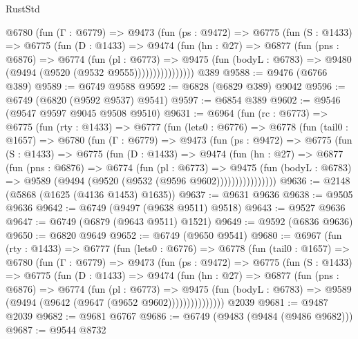 \begin{lexlean}{RustStd}
\begin{coremodule}
            @6780
              (fun (Γ : @6779) =>
              @9473
                (fun (ps : @9472) =>
                @6775
                  (fun (S : @1433) =>
                  @6775
                    (fun (D : @1433) =>
                    @9474
                      (fun (hn : @27) =>
                      @6877
                        (fun (pns : @6876) =>
                        @6774
                          (fun (pl : @6773) =>
                          @9475
                            (fun (bodyL : @6783) => @9480 (@9494 (@9520 (@9532 @9555))))))))))))))))
    @389
@9588 := @9476 (@6766 @389)
@9589 := @6749 @9588
@9592 := @6828 (@6829 @389) @9042
@9596 := @6749 (@6820 (@9592 @9537) @9541)
@9597 := @6854 @389
@9602 := @9546 (@9547 @9597 @9045 @9508 @9510)
@9631 := @6964
    (fun (rc : @6773) =>
    @6775
      (fun (rty : @1433) =>
      @6777
        (fun (lets0 : @6776) =>
        @6778
          (fun (tail0 : @1657) =>
          @6780
            (fun (Γ : @6779) =>
            @9473
              (fun (ps : @9472) =>
              @6775
                (fun (S : @1433) =>
                @6775
                  (fun (D : @1433) =>
                  @9474
                    (fun (hn : @27) =>
                    @6877
                      (fun (pns : @6876) =>
                      @6774
                        (fun (pl : @6773) =>
                        @9475
                          (fun (bodyL : @6783) =>
                          @9589 (@9494 (@9520 (@9532 (@9596 @9602))))))))))))))))
@9636 := @2148 (@5868 (@1625 (@4136 @1453) @1635))
@9637 := @9631 @9636
@9638 := @9505 @9636
@9642 := @6749 (@9497 (@9638 @9511) @9518)
@9643 := @9527 @9636
@9647 := @6749 (@6879 (@9643 @9511) @1521)
@9649 := @9592 (@6836 @9636)
@9650 := @6820 @9649
@9652 := @6749 (@9650 @9541)
@9680 := @6967
    (fun (rty : @1433) =>
    @6777
      (fun (lets0 : @6776) =>
      @6778
        (fun (tail0 : @1657) =>
        @6780
          (fun (Γ : @6779) =>
          @9473
            (fun (ps : @9472) =>
            @6775
              (fun (S : @1433) =>
              @6775
                (fun (D : @1433) =>
                @9474
                  (fun (hn : @27) =>
                  @6877
                    (fun (pns : @6876) =>
                    @6774
                      (fun (pl : @6773) =>
                      @9475
                        (fun (bodyL : @6783) =>
                        @9589 (@9494 (@9642 (@9647 (@9652 @9602)))))))))))))))
    @2039
@9681 := @9487 @2039
@9682 := @9681 @6767
@9686 := @6749 (@9483 (@9484 (@9486 @9682)))
@9687 := @9544 @8732

\end{coremodule}
\end{lexlean}
